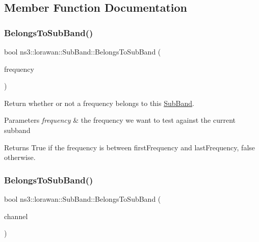 \subsection{Member Function Documentation}
\mbox{\label{classns3_1_1lorawan_1_1SubBand_a2ae058fe3857811e9bf094e64c30fb41}} 
\subsubsection{\texorpdfstring{Belongs\+To\+Sub\+Band()}{BelongsToSubBand()}\hspace{0.1cm}{\footnotesize\ttfamily [1/2]}}
{\footnotesize\ttfamily bool ns3\+::lorawan\+::\+Sub\+Band\+::\+Belongs\+To\+Sub\+Band (\begin{DoxyParamCaption}\item[{double}]{frequency }\end{DoxyParamCaption})}

Return whether or not a frequency belongs to this \hyperlink{classns3_1_1lorawan_1_1SubBand}{Sub\+Band}.


\begin{DoxyParams}{Parameters}
{\em frequency} & the frequency we want to test against the current subband \\
\hline
\end{DoxyParams}
\begin{DoxyReturn}{Returns}
True if the frequency is between first\+Frequency and last\+Frequency, false otherwise. 
\end{DoxyReturn}
\mbox{\label{classns3_1_1lorawan_1_1SubBand_ae63724cfdd997fb554d076b513637d07}} 
\subsubsection{\texorpdfstring{Belongs\+To\+Sub\+Band()}{BelongsToSubBand()}\hspace{0.1cm}{\footnotesize\ttfamily [2/2]}}
{\footnotesize\ttfamily bool ns3\+::lorawan\+::\+Sub\+Band\+::\+Belongs\+To\+Sub\+Band (\begin{DoxyParamCaption}\item[{Ptr$<$ \hyperlink{classns3_1_1lorawan_1_1LogicalLoraChannel}{Logical\+Lora\+Channel} $>$}]{channel }\end{DoxyParamCaption})}

